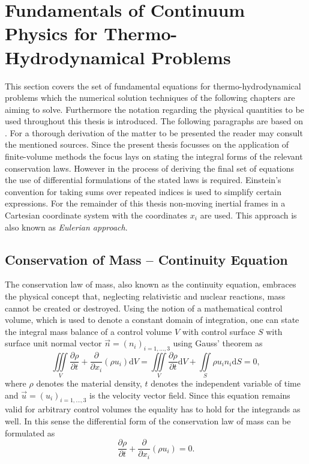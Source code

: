 
  \section{Fundamentals of Continuum Physics for Thermo-Hydrodynamical Problems}

  This section covers the set of fundamental equations for thermo-hydrodynamical problems which the numerical solution techniques of the following chapters are aiming to solve. Furthermore the notation regarding the physical quantities to be used throughout this thesis is introduced. The following paragraphs are based on \cite{andersson84,ferziger02,kundu12,spurk10}. For a thorough derivation of the matter to be presented the reader may consult the mentioned sources. Since the present thesis focusses on the application of finite-volume methods the focus lays on stating the integral forms of the relevant conservation laws. However in the process of deriving the final set of equations the use of differential formulations of the stated laws is required. Einstein's convention for taking sums over repeated indices is used to simplify certain expressions. For the remainder of this thesis non-moving inertial frames in a Cartesian coordinate system with the coordinates \( x_i \) are used. This approach is also known as \emph{Eulerian approach}.  

    \subsection{Conservation of Mass -- Continuity Equation}

    The conservation law of mass, also known as the continuity equation, embraces the physical concept that, neglecting relativistic and nuclear reactions, mass cannot be created or destroyed. Using the notion of a mathematical control volume, which is used to denote a constant domain of integration, one can state the integral mass balance of a control volume \(V\) with control surface \(S\) with surface unit normal vector \(\vec{n} = \left( n_i \right)_{i=1,\dots,3}\) using Gauss' theorem as
    \begin{displaymath}
      \iiint\limits_V \frac{\partial \rho}{\partial t} + \frac{\partial}{\partial x_i}\left( \rho u_i \right) \mathrm{d}V 
      =  \iiint\limits_V \frac{\partial \rho}{\partial t} \mathrm{d}V + \iint\limits_S \rho u_i n_i \mathrm{d}S
      = 0,
    \end{displaymath}
    where \( \rho \) denotes the material density, \(t \) denotes the independent variable of time and \(\vec{u} = \left( u_i \right)_{i=1,\dots,3}\) is the velocity vector field. Since this equation remains valid for arbitrary control volumes the equality has to hold for the integrands as well. In this sense the differential form of the conservation law of mass can be formulated as
    \begin{equation}
      \label{eq:contifull}
      \frac{\partial \rho}{\partial t} + \frac{\partial}{\partial x_i}\left( \rho u_i \right)
      = 0.
    \end{equation}

